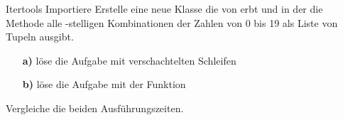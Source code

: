 \begin{frame}{Itertools}
	Importiere 
	\linebreak
	Erstelle eine neue Klasse die von  erbt und in der die Methode alle -stelligen Kombinationen der Zahlen von 0 bis 19 als Liste von Tupeln ausgibt. 
	\begin{itemize}
		\item[\textbf{a)}] löse die Aufgabe mit verschachtelten  Schleifen
		\item[\textbf{b)}] löse die Aufgabe mit der  Funktion
	\end{itemize}
	Vergleiche die beiden Ausführungszeiten.
\end{frame}


